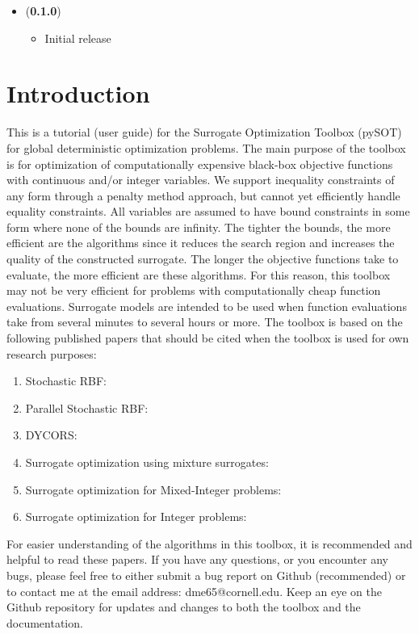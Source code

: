 \documentclass[]{article}
\begin{document}
\begin{itemize}
	\item (\textbf{0.1.0})
	\begin{itemize}
		\item 	Initial release
	\end{itemize}
\end{itemize}

\section{Introduction}
This is a tutorial (user guide) for the Surrogate Optimization Toolbox (pySOT) for global deterministic 
optimization problems. The main purpose of the toolbox is for optimization of computationally expensive 
black-box objective functions with continuous and/or integer variables. We support inequality constraints 
of any form through a penalty method approach, but cannot yet efficiently handle equality constraints. 
All variables are assumed to have bound constraints in some form where none of the bounds are infinity. 
The tighter the bounds, the more efficient are the algorithms since it reduces the search region and 
increases the quality of the constructed surrogate. The longer the objective functions take to evaluate, 
the more efficient are these algorithms. For this reason, this toolbox may not be very efficient for problems 
with computationally cheap function evaluations. Surrogate models are intended to be used when function
 evaluations take from several minutes to several hours or more. The toolbox is based on the following 
 published papers that should be cited when the toolbox is used for own research purposes:
\begin{enumerate}
\item Stochastic RBF: \cite{regis2007stochastic}
\item Parallel Stochastic RBF: \cite{regis2009parallel}
\item DYCORS: \cite{regis2013combining}
\item Surrogate optimization using mixture surrogates: \cite{muller2011mixture}
\item Surrogate optimization for Mixed-Integer problems: \cite{muller2013so}
\item Surrogate optimization for Integer problems: \cite{muller2014so}
\end{enumerate}
For easier understanding of the algorithms in this toolbox, it is recommended and helpful to read these 
papers. If you have any questions, or you encounter any bugs, please feel free to either submit a bug 
report on Github (recommended) or to contact me at the email address: dme65@cornell.edu. Keep 
an eye on the Github repository for updates and changes to both the toolbox and the documentation.
\end{document}
